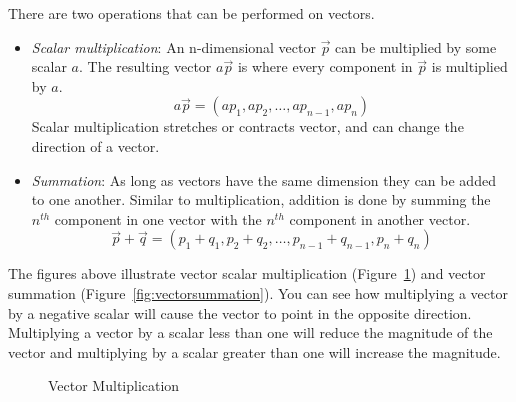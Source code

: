 \documentclass[12pt]{article}
\begin{document}
 There are two operations that can be performed on vectors. 
\begin{itemize}
\item \emph{Scalar multiplication}: An n-dimensional vector $\vec{p}$ can be multiplied by some scalar $a$. The resulting vector $a\vec{p}$ is where every component in $\vec{p}$ is multiplied by $a$.
\[
a\vec{p} = (ap_1, ap_2, \ldots, ap_{n-1}, ap_n)
\]
Scalar multiplication stretches or contracts vector, and can change the direction of a vector.
\item \emph{Summation}: As long as vectors have the same dimension they can be added to one another. Similar to multiplication, addition is done by summing the $n^{th}$ component in one vector with the $n^{th}$ component in another vector. 
\[
\vec{p}+\vec{q} = (p_1 + q_1, p_2 + q_2, \ldots, p_{n-1} + q_{n-1}, p_n + q_n)
\]
\end{itemize}

 The figures above illustrate vector scalar multiplication (Figure~\ref{fig:vectormultiplication}) and vector summation (Figure~\ref{fig:vectorsummation}). You can see how multiplying a vector by a negative scalar will cause the vector to point in the opposite direction. Multiplying a vector by a scalar less than one will reduce the magnitude of the vector and multiplying by a scalar greater than one will increase the magnitude.

\begin{figure}[h!]
\centering
\caption{Vector Multiplication}
\label{fig:vectormultiplication}
\end{figure}
\end{document}
